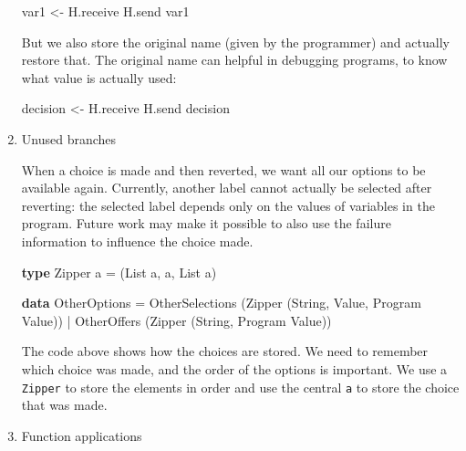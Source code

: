 \documentclass[runningheads,plain]{llncs}
\newenvironment{Shaded}{}{}
\newcommand{\KeywordTok}[1]{\textcolor[rgb]{0.00,0.44,0.13}{\textbf{#1}}}
\newcommand{\DataTypeTok}[1]{\textcolor[rgb]{0.56,0.13,0.00}{#1}}
\newcommand{\OtherTok}[1]{\textcolor[rgb]{0.00,0.44,0.13}{#1}}
\newcommand{\FunctionTok}[1]{\textcolor[rgb]{0.02,0.16,0.49}{#1}}
\newcommand{\NormalTok}[1]{#1}
\begin{document}
\begin{enumerate}
\begin{Shaded}
\begin{Highlighting}[]
\NormalTok{var1 }\OtherTok{<-}\NormalTok{ H.receive}
\NormalTok{H.send var1}
\end{Highlighting}
\end{Shaded}

  But we also store the original name (given by the programmer) and
  actually restore that. The original name can helpful in debugging
  programs, to know what value is actually used:

\begin{Shaded}
\begin{Highlighting}[]
\NormalTok{decision }\OtherTok{<-}\NormalTok{ H.receive}
\NormalTok{H.send decision}
\end{Highlighting}
\end{Shaded}
\item
  Unused branches

  When a choice is made and then reverted, we want all our options to be
  available again. Currently, another label cannot actually be selected
  after reverting: the selected label depends only on the values of
  variables in the program. Future work may make it possible to also use
  the failure information to influence the choice made.

\begin{Shaded}
\begin{Highlighting}[]
\KeywordTok{type} \DataTypeTok{Zipper}\NormalTok{ a }\FunctionTok{=}\NormalTok{ (}\DataTypeTok{List}\NormalTok{ a, a, }\DataTypeTok{List}\NormalTok{ a)}

\KeywordTok{data} \DataTypeTok{OtherOptions}
    \FunctionTok{=} \DataTypeTok{OtherSelections}\NormalTok{ (}\DataTypeTok{Zipper}\NormalTok{ (}\DataTypeTok{String}\NormalTok{, }\DataTypeTok{Value}\NormalTok{, }\DataTypeTok{Program} \DataTypeTok{Value}\NormalTok{))}
    \FunctionTok{|} \DataTypeTok{OtherOffers}\NormalTok{ (}\DataTypeTok{Zipper}\NormalTok{ (}\DataTypeTok{String}\NormalTok{, }\DataTypeTok{Program} \DataTypeTok{Value}\NormalTok{))}
\end{Highlighting}
\end{Shaded}

  The code above shows how the choices are stored. We need to remember
  which choice was made, and the order of the options is important. We
  use a \texttt{Zipper} to store the elements in order and use the
  central \texttt{a} to store the choice that was made.
\item
  Function applications


\end{enumerate}
\end{document}
